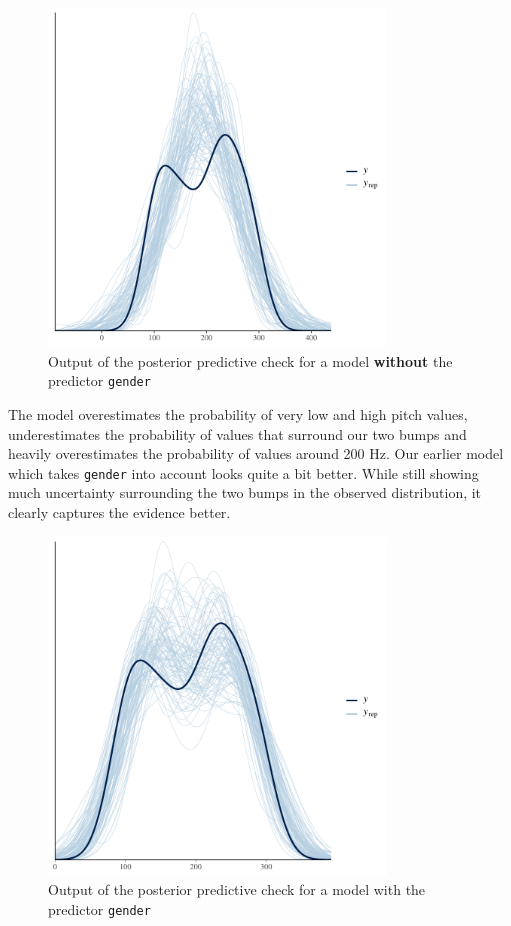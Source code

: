 \documentclass[nobib]{tufte-handout}
\begin{document}
\begin{figure}[]
  \centering
    \includegraphics[width = 0.8\textwidth]{pics/pp_check_FE_noGender.pdf}
    \caption{Output of the posterior predictive check for a model \textbf{without} the predictor \texttt{gender}}
    \label{fig:coefficients_table}
\end{figure}


The model overestimates the probability of very low and high pitch values, underestimates the probability of values that surround our two bumps and heavily overestimates the probability of values around 200 Hz.
Our earlier model which takes \texttt{gender} into account looks quite a bit better. While still showing much uncertainty surrounding the two bumps in the observed distribution, it clearly captures the evidence better. 

\begin{figure}[]
  \centering
    \includegraphics[width = 0.8\textwidth]{pics/pp_check_FE.pdf}
    \caption{Output of the posterior predictive check for a model with the predictor \texttt{gender}}
    \label{fig:coefficients_table}
\end{figure}
\end{document}
